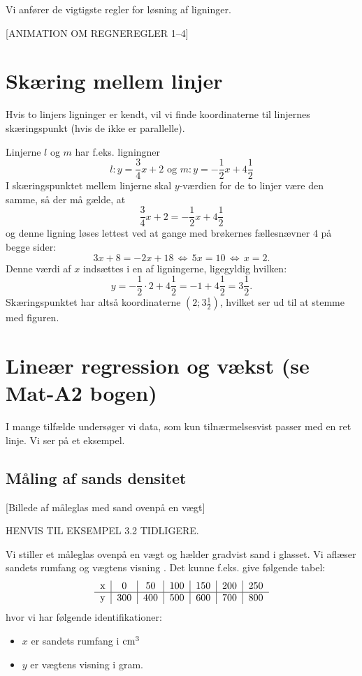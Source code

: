 \documentclass[12pt,oneside,a4paper]{article}
\begin{document}
Vi anfører de vigtigste regler for løsning af ligninger.

[ANIMATION OM REGNEREGLER 1--4]


\section{Skæring mellem linjer}
Hvis to linjers ligninger er kendt, vil vi finde koordinaterne til linjernes
skæringspunkt (hvis de ikke er parallelle).

Linjerne $l$ og $m$ har f.eks. ligningner
$$
l: y=\frac{3}{4}x+2\,\,{\mbox{og}}\,\,m: y=-\frac{1}{2}x+4\frac{1}{2}
$$
I skæringspunktet mellem linjerne skal $y$-værdien for de to linjer være den
samme, så der må gælde, at
$$
\frac{3}{4}x+2=-\frac{1}{2}x+4\frac{1}{2}
$$
og denne ligning løses lettest ved at gange med brøkernes fællesnævner $4$ på
begge sider:
$$
3x+8 = -2x+18\,\Leftrightarrow\,5x=10\,\Leftrightarrow\,x=2.
$$
Denne værdi af $x$ indsættes i en af ligningerne, ligegyldig hvilken:
$$
y=-\frac{1}{2}\cdot 2+4\frac{1}{2} = -1+4\frac12 = 3\frac12.
$$
Skæringspunktet har altså koordinaterne $(2; 3\frac12)$, hvilket ser ud til at
stemme med figuren.

\section{Lineær regression og vækst (se Mat-A2 bogen)}
I mange tilfælde undersøger vi data, som kun tilnærmelsesvist passer med en ret
linje. Vi ser på et eksempel.

\subsection{Måling af sands densitet}
[Billede af måleglas med sand ovenpå en vægt]

HENVIS TIL EKSEMPEL 3.2 TIDLIGERE.

Vi stiller et måleglas ovenpå en vægt og hælder gradvist sand i glasset. Vi
aflæser sandets rumfang og vægtens visning . Det kunne f.eks. give følgende
tabel:
$$
\begin{tabular}{c|c|c|c|c|c|c}
    x &   0 &  50 & 100 & 150 & 200 & 250 \\
    \hline
    y & 300 & 400 & 500 & 600 & 700 & 800
\end{tabular}
$$
hvor vi har følgende identifikationer:
\begin{itemize}
    \item $x$ er sandets rumfang i ${\rm cm}^3$
    \item $y$ er vægtens visning i gram.
\end{itemize}
\end{document}

